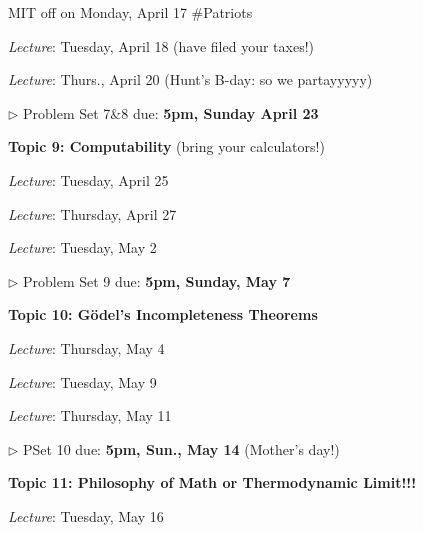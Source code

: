 \documentclass[11pt, a4paper]{article}
\begin{document}
\begin{center}
\begin{minipage}{4.5in}
\begin{flushleft}
\item

MIT off on Monday, April 17 \#Patriots

\emph{Lecture}: Tuesday, April 18 (have filed your taxes!)

\emph{Lecture}: Thurs., April 20 (Hunt's B-day: so we partayyyyy)

$\triangleright$ Problem Set 7\&8 due: \textbf{5pm, Sunday April 23}

\end{flushleft}\end{minipage}
\end{center}
\pagebreak
\begin{center}\begin{minipage}{4.5 in}
\begin{flushleft}

\item[\textbf{Topic 9: Computability} (bring your calculators!)]
\item

\emph{Lecture}: Tuesday, April 25

\emph{Lecture}: Thursday, April 27

\emph{Lecture}: Tuesday, May 2


$\triangleright$ Problem Set 9 due: \textbf{5pm, Sunday, May 7}

\item[\textbf{Topic 10: Gödel's Incompleteness Theorems}]

\item 

\emph{Lecture}: Thursday, May 4

\emph{Lecture}: Tuesday, May 9
 
\emph{Lecture}: Thursday, May 11
 
$\triangleright$ PSet 10 due: \textbf{5pm, Sun., May 14} (Mother's day!)

\item[\textbf{Topic 11: Philosophy of Math or Thermodynamic Limit!!!}]
 
 
\emph{Lecture}: Tuesday, May 16


\end{flushleft}\end{minipage}
\end{center}
\end{document}
